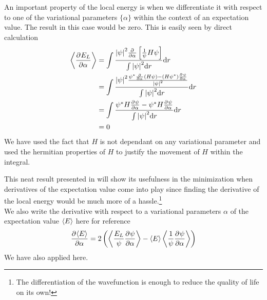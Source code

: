         An important property of the local energy is when we differentiate it
        with respect to one of the variational parameters $\{\alpha\}$ within
        the context of an expectation value. The result in this case would be
        zero. This is easily seen by direct calculation
            \begin{align}
                \ecp{\prd{\alpha}[E_L]} &= \int \frac{\abs{\psi}^2\prd{\alpha}
                \left[\frac{1}{\psi}H\psi\right]}{\int \abs{\psi}^2 \md r} \md
                r \nonumber \\
                &= \int \frac{\abs{\psi}^2 \frac{\psi^{*}\prd{\alpha}(H\psi) -
                (H\psi^{*}) \prd{\alpha}[\psi]}{\abs{\psi}^2}}{\int
                \abs{\psi}^2 \md r} \md r \nonumber \\
                &= \int \frac{\psi^{*}H\prd{\alpha}[\psi] -
                \psi^{*}H\prd{\alpha}[\psi]}{\int \abs{\psi}^2 \md r} \md r
                \nonumber \\
                &= 0
                \label{eq:expELdelzero}
            \end{align}
        We have used the fact that $H$ is not dependant on any variational
        parameter and used the hermitian properties\cite{GriffQuan} of $H$ to
        justify the movement of $H$ within the integral.  

        This neat result presented in  will show its
        usefulness in the minimization when derivatives of the expectation
        value come into play since finding the derivative of the local energy
        would be much more of a hassle.\footnote{The differentiation of the
        wavefunction is enough to reduce the quality of life on its own!} \\
        We also write the derivative with respect to a variational parameters
        $\alpha$ of the expectation value $\left< {E} \right>$ here for reference
            \begin{equation}
               \prd{\alpha}[\ecp{E}] =
                2\left(\ecp{\frac{E_L}{\psi}\prd{\alpha}[\psi]} -
                \ecp{E}\ecp{\frac{1}{\psi}\prd{\alpha}[\psi]}\right)
            \end{equation}
        We have also applied  here.

